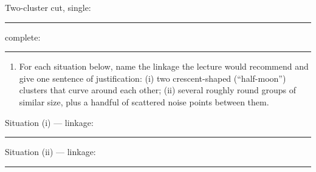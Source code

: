 \documentclass[
  11pt,
]{article}
\providecommand{\tightlist}{%
  \setlength{\itemsep}{0pt}\setlength{\parskip}{0pt}}
\newcommand{\answerspace}[1]{\par\vspace*{#1}}  %
\newcommand{\blank}[1][1.2in]{\rule{#1}{0.4pt}}
\begin{document}
Two-cluster cut, single: \blank[2in] \qquad complete: \blank[2in]

\answerspace{1.4in}

\begin{enumerate}
\def\labelenumi{(\alph{enumi})}
\setcounter{enumi}{3}
\tightlist
\item
  For each situation below, name the linkage the lecture would recommend
  and give one sentence of justification: (i) two crescent-shaped
  (``half-moon'') clusters that curve around each other; (ii) several
  roughly round groups of similar size, plus a handful of scattered
  noise points between them.
\end{enumerate}

Situation (i) --- linkage: \blank[1.5in]

\answerspace{1in}

Situation (ii) --- linkage: \blank[1.5in]

\answerspace{1in}
\end{document}
